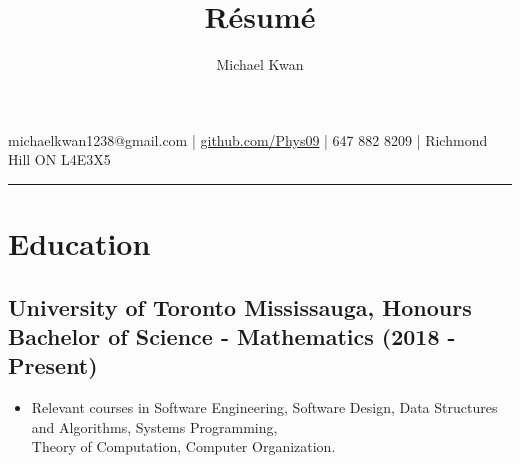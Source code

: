 \documentclass[10pt]{article}
\makeatletter
\renewcommand{\maketitle}{
    \begin{flushleft}{\Huge\bfseries\theauthor}
    \end{flushleft}

    \begin{center}
        \vspace{-8pt}
        michaelkwan1238@gmail.com | \href{https://github.com/Phys09}{github.com/Phys09} | 647 882 8209 | Richmond Hill ON L4E3X5
        \vspace{2pt}
        \rule[9pt]{\textwidth}{1.5pt}
        \vspace{1pt}
    \end{center}
}
\makeatother
\begin{document}

\title{R\'esum\'e}
\author{
  \fontsize{16}{4pt}\selectfont Michael Kwan
}

\maketitle
\vspace{-40pt}

\section{Education}

\subsection{University of Toronto Mississauga, Honours Bachelor of Science - Mathematics (2018 - Present)}
\begin{itemize}
  \item Relevant courses in Software Engineering, Software Design, Data Structures and Algorithms, Systems Programming, \\
        Theory of Computation, Computer Organization.
\end{itemize}
\end{document}
